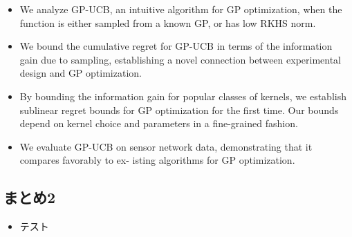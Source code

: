 \documentclass[dvipdfmx, 10.5pt]{beamer}
\begin{document}
\begin{frame}{\insertsubsection}
	\begin{itemize}
		\item We analyze GP-UCB, an intuitive algorithm for GP optimization, when the function is either sampled from a known GP, or has low RKHS norm.
		\item We bound the cumulative regret for GP-UCB in terms of the information gain due to sampling, establishing a novel connection between experimental design and GP optimization.
		\item By bounding the information gain for popular classes of kernels, we establish sublinear regret bounds for GP optimization for the first time. Our bounds depend on kernel choice and parameters in a fine-grained fashion.
		\item We evaluate GP-UCB on sensor network data, demonstrating that it compares favorably to ex- isting algorithms for GP optimization.
	\end{itemize}

\end{frame}


\subsection{まとめ2}
\begin{frame}{\insertsubsection}
	\begin{itemize}
		\item テスト
	\end{itemize}

\end{frame}

\end{document}
